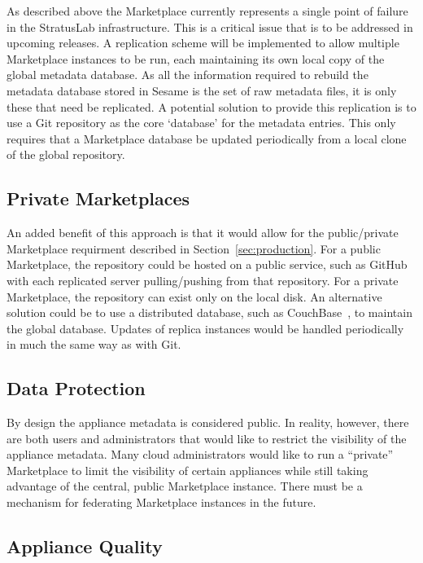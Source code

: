 As described above the Marketplace currently represents a single point
of failure in the StratusLab infrastructure. This is a critical issue
that is to be addressed in upcoming releases. A replication scheme
will be implemented to allow multiple Marketplace instances to be run,
each maintaining its own local copy of the global metadata
database. As all the information required to rebuild the metadata
database stored in Sesame is the set of raw metadata files, it is only
these that need be replicated. A potential solution to provide this
replication is to use a Git repository as the core `database' for the
metadata entries. This only requires that a Marketplace database be
updated periodically from a local clone of the global repository.

\subsection{Private Marketplaces}

An added benefit of this approach is that it would allow for the
public/private Marketplace requirment described in
Section~\ref{sec:production}. For a public Marketplace, the repository
could be hosted on a public service, such as GitHub~\cite{github} with
each replicated server pulling/pushing from that repository.  For a
private Marketplace, the repository can exist only on the local
disk. An alternative solution could be to use a distributed database,
such as CouchBase~\cite{couchbase}, to maintain the global
database. Updates of replica instances would be handled periodically
in much the same way as with Git.

\subsection{Data Protection}

By design the appliance metadata is considered public.  In reality,
however, there are both users and administrators that would like to
restrict the visibility of the appliance metadata.  Many cloud
administrators would like to run a ``private'' Marketplace to limit
the visibility of certain appliances while still taking advantage of
the central, public Marketplace instance.  There must be a mechanism
for federating Marketplace instances in the future. 

\subsection{Appliance Quality}

